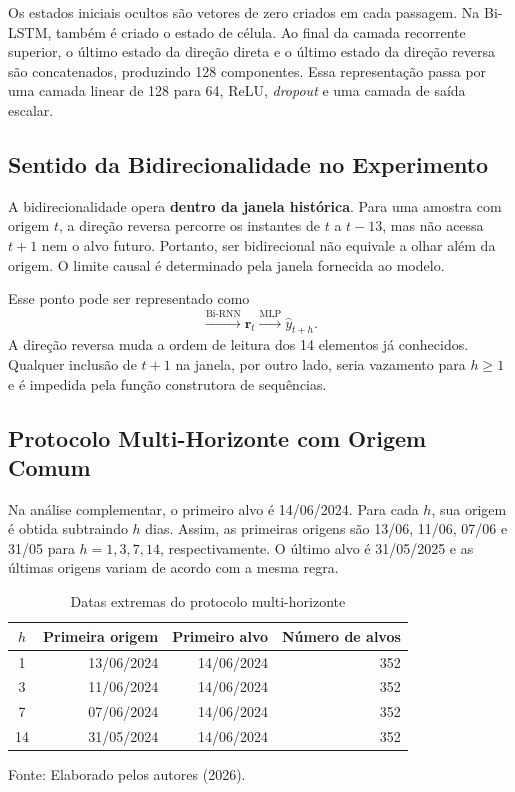 Os estados iniciais ocultos são vetores de zero criados em cada passagem. Na Bi-LSTM, também é criado o estado de célula. Ao final da camada recorrente superior, o último estado da direção direta e o último estado da direção reversa são concatenados, produzindo 128 componentes. Essa representação passa por uma camada linear de 128 para 64, ReLU, \textit{dropout} e uma camada de saída escalar.

\subsection{Sentido da Bidirecionalidade no Experimento}

A bidirecionalidade opera \textbf{dentro da janela histórica}. Para uma amostra com origem $t$, a direção reversa percorre os instantes de $t$ a $t-13$, mas não acessa $t+1$ nem o alvo futuro. Portanto, ser bidirecional não equivale a olhar além da origem. O limite causal é determinado pela janela fornecida ao modelo.

Esse ponto pode ser representado como
\begin{equation}
 [t-13,\ldots,t]\xrightarrow{\text{Bi-RNN}}\mathbf{r}_t
 \xrightarrow{\text{MLP}}\widehat y_{t+h}.
\end{equation}
A direção reversa muda a ordem de leitura dos 14 elementos já conhecidos. Qualquer inclusão de $t+1$ na janela, por outro lado, seria vazamento para $h\geq1$ e é impedida pela função construtora de sequências.

\subsection{Protocolo Multi-Horizonte com Origem Comum}

Na análise complementar, o primeiro alvo é 14/06/2024. Para cada $h$, sua origem é obtida subtraindo $h$ dias. Assim, as primeiras origens são 13/06, 11/06, 07/06 e 31/05 para $h=1,3,7,14$, respectivamente. O último alvo é 31/05/2025 e as últimas origens variam de acordo com a mesma regra.

\begin{table}[H]
\centering
\caption{Datas extremas do protocolo multi-horizonte}
\label{tab:datas_multihorizonte_detalhado}
\small
\begin{tabular}{crrr}
\toprule
$h$ & \textbf{Primeira origem} & \textbf{Primeiro alvo} & \textbf{Número de alvos} \\
\midrule
1 & 13/06/2024 & 14/06/2024 & 352 \\
3 & 11/06/2024 & 14/06/2024 & 352 \\
7 & 07/06/2024 & 14/06/2024 & 352 \\
14 & 31/05/2024 & 14/06/2024 & 352 \\
\bottomrule
\end{tabular}
\par\smallskip
{\small Fonte: Elaborado pelos autores (2026).\par}
\end{table}

